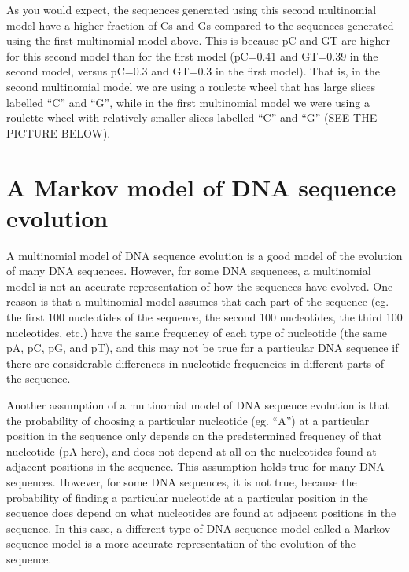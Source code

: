 \documentclass[
]{book}
\begin{document}
As you would expect, the sequences generated using this second multinomial model have a higher fraction of Cs and Gs compared to the sequences generated using the first multinomial model above. This is because pC and GT are higher for this second model than for the first model (pC=0.41 and GT=0.39 in the second model, versus pC=0.3 and GT=0.3 in the first model). That is, in the second multinomial model we are using a roulette wheel that has large slices labelled ``C'' and ``G'', while in the first multinomial model we were using a roulette wheel with relatively smaller slices labelled ``C'' and ``G'' (SEE THE PICTURE BELOW).

\hypertarget{a-markov-model-of-dna-sequence-evolution}{%
\section{A Markov model of DNA sequence evolution}\label{a-markov-model-of-dna-sequence-evolution}}

A multinomial model of DNA sequence evolution is a good model of the evolution of many DNA sequences. However, for some DNA sequences, a multinomial model is not an accurate representation of how the sequences have evolved. One reason is that a multinomial model assumes that each part of the sequence (eg. the first 100 nucleotides of the sequence, the second 100 nucleotides, the third 100 nucleotides, etc.) have the same frequency of each type of nucleotide (the same pA, pC, pG, and pT), and this may not be true for a particular DNA sequence if there are considerable differences in nucleotide frequencies in different parts of the sequence.

Another assumption of a multinomial model of DNA sequence evolution is that the probability of choosing a particular nucleotide (eg. ``A'') at a particular position in the sequence only depends on the predetermined frequency of that nucleotide (pA here), and does not depend at all on the nucleotides found at adjacent positions in the sequence. This assumption holds true for many DNA sequences. However, for some DNA sequences, it is not true, because the probability of finding a particular nucleotide at a particular position in the sequence does depend on what nucleotides are found at adjacent positions in the sequence. In this case, a different type of DNA sequence model called a Markov sequence model is a more accurate representation of the evolution of the sequence.
\end{document}
